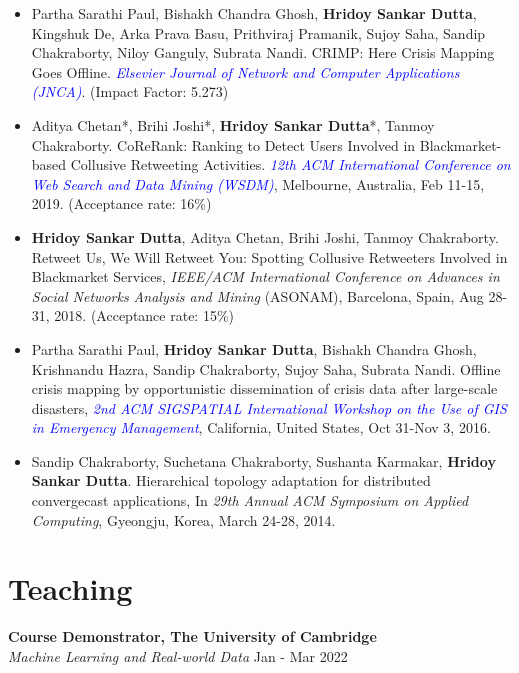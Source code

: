 \documentclass[margin, centered]{res}
\begin{document}
\begin{resume}
\begin{itemize}[leftmargin=*]
\item Partha Sarathi Paul, Bishakh Chandra Ghosh, \textbf{Hridoy Sankar Dutta}, Kingshuk De, Arka Prava Basu, Prithviraj Pramanik, Sujoy Saha, Sandip Chakraborty, Niloy Ganguly, Subrata Nandi. CRIMP: Here Crisis Mapping Goes Offline. \textit{\textcolor{blue}{Elsevier Journal of Network and Computer Applications (JNCA)}}. (Impact Factor: 5.273)

\item  Aditya Chetan*, Brihi Joshi*, \textbf{Hridoy Sankar Dutta}*, Tanmoy Chakraborty. CoReRank: Ranking to Detect Users Involved in Blackmarket-based Collusive Retweeting Activities. \textit{\textcolor{blue}{12th ACM International Conference on Web Search and Data Mining (WSDM)}}, Melbourne, Australia, Feb 11-15, 2019. (Acceptance rate: 16\%)


\item \textbf{Hridoy Sankar Dutta}, Aditya Chetan, Brihi Joshi, Tanmoy Chakraborty. Retweet Us, We Will Retweet You: Spotting Collusive Retweeters Involved in Blackmarket Services, \textit{IEEE/ACM International Conference on Advances in Social Networks Analysis and Mining} (ASONAM), Barcelona, Spain, Aug 28-31, 2018. (Acceptance rate: 15\%)

\item Partha Sarathi Paul, \textbf{Hridoy Sankar Dutta}, Bishakh Chandra Ghosh, Krishnandu Hazra, Sandip Chakraborty, Sujoy Saha, Subrata Nandi. Offline crisis mapping by opportunistic dissemination of crisis data after large-scale disasters, \textit{\textcolor{blue}{2nd ACM SIGSPATIAL International Workshop on the Use of GIS in Emergency Management}}, California, United States, Oct 31-Nov 3, 2016.

\item Sandip Chakraborty, Suchetana Chakraborty, Sushanta Karmakar, \textbf{Hridoy Sankar Dutta}. Hierarchical topology adaptation for distributed convergecast applications, In \textit{29th Annual ACM Symposium on Applied Computing}, Gyeongju, Korea, March 24-28, 2014.
\end{itemize}


\section{Teaching}
\textbf{Course Demonstrator, The University of Cambridge} \\
\emph{Machine Learning and Real-world Data} \hfill Jan - Mar 2022


\end{resume}
\end{document}
